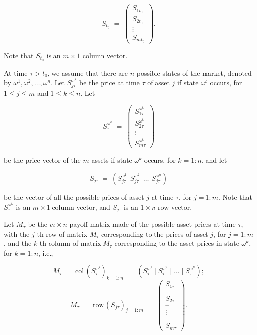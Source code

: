 \[
S_{t_0} \;=\;
\begin{pmatrix} S_{1t_0} \\ S_{2t_0} \\ \vdots \\ S_{mt_0} \end{pmatrix}.
\]

Note that $S_{t_0}$ is an $m \times 1$ column vector.

At time $\tau > t_0$, we assume that there are $n$ possible states of the
market, denoted by $\omega^1, \omega^2, \ldots, \omega^n$. Let
$S_{j\tau}^{\omega^k}$ be the price at time $\tau$ of asset $j$ if state
$\omega^k$ occurs, for $1 \le j \le m$ and $1 \le k \le n$. Let

\begin{equation}
S_\tau^{\omega^k} \;=\;
\begin{pmatrix} S_{1\tau}^{\omega^k} \\ S_{2\tau}^{\omega^k} \\ \vdots \\
S_{m\tau}^{\omega^k} \end{pmatrix}
\end{equation}

be the price vector of the $m$ assets if state $\omega^k$ occurs, for
$k = 1:n$, and let

\[
S_{j\tau} \;=\; \left(S_{j\tau}^{\omega^1}\ \ S_{j\tau}^{\omega^2}\ \ \ldots\
\ S_{j\tau}^{\omega^n}\right)
\]

be the vector of all the possible prices of asset $j$ at time $\tau$, for
$j = 1:m$. Note that $S_\tau^{\omega^k}$ is an $m \times 1$ column vector,
and $S_{j\tau}$ is an $1 \times n$ row vector.

Let $M_\tau$ be the $m \times n$ payoff matrix made of the possible asset
prices at time $\tau$, with the $j$-th row of matrix $M_\tau$ corresponding
to the prices of asset $j$, for $j = 1:m$, and the $k$-th column of matrix
$M_\tau$ corresponding to the asset prices in state $\omega^k$, for
$k = 1:n$, i.e.,

\begin{equation}
M_\tau \;=\; \mathrm{col}\,\left(S_\tau^{\omega^k}\right)_{k=1:n} \;=\;
\left(S_\tau^{\omega^1} \mid S_\tau^{\omega^2} \mid \ldots \mid
S_\tau^{\omega^n}\right);
\end{equation}
\begin{equation}
M_\tau \;=\; \mathrm{row}\,(S_{j\tau})_{j=1:m} \;=\;
\begin{pmatrix} S_{1\tau} \\ \text{--} \\ S_{2\tau} \\ \text{--} \\ \vdots \\
\text{--} \\ S_{m\tau} \end{pmatrix}.
\end{equation}

